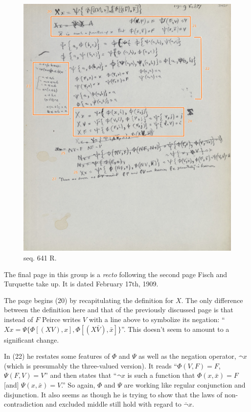 \begin{figure}
    \centering
    \includegraphics[width=\textwidth]{images/seq641.jpeg}
    \caption{seq. 641 R.}
    \label{fig:641}
\end{figure}

The final page in this group is a \textit{recto} following the second page Fisch and Turquette take up. It is dated February 17th, 1909.

The page begins (20) by recapitulating the definition for $X$. The only difference between the definition here and that of the previously discussed page is that instead of $F$ Peirce writes $V$ with a line above to symbolize its negation: ``$Xx=\Psi\{\Phi[(XV), x], \Phi[(X\bar{V}),\bar{x}]\}$''. This doesn't seem to amount to a significant change.

In (22) he restates some features of $\Phi$ and $\Psi$ as well as the negation operator, $\bar{\lnot}x$ (which is presumably the three-valued version). It reads ``$\Phi(V,F)=F$, $\Psi(F,V)=V$'' and then states that ``$\bar{\lnot}x$ is such a function that $\Phi(x,\bar{x})=F$ [and] $\Psi(x, \bar{x})=V$.'' So again, $\Phi$ and $\Psi$ are working like regular conjunction and disjunction. It also seems as though he is trying to show that the laws of non-contradiction and excluded middle still hold with regard to $\bar{\lnot}x$. 

